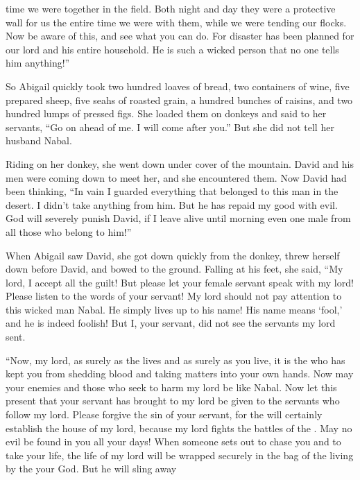 {time
we
were together
in the field.
Both
night
and day
they were a protective wall
for us
the entire
time
we were with
them,
while we were tending
our flocks.
Now
be aware
of this, and see
what
you can do.
For
disaster
has been planned
for our lord
and his entire
household.
He is
such a wicked
person that no one tells him anything!”
\par }{\PP {}So Abigail
quickly
took
two hundred
loaves of bread,
two
containers
of wine,
five
prepared sheep,
five
seahs
of roasted
grain, a hundred
bunches of raisins,
and two hundred
lumps
of pressed
figs.
She loaded
them on
donkeys
and said
to her servants,
“Go
on ahead
of me. I
will come
after
you.” But
she did not
tell
her husband
Nabal.
\par }{\PP {}Riding
on
her donkey,
she went down
under cover
of the mountain.
David
and his men
were coming down
to meet
her, and she encountered them.
Now David
had been thinking, “In vain
I guarded everything
that
belonged to this
man in the desert.
I didn’t take
anything
from
him. But he has repaid
my good
with evil.
God
will severely
punish David,
if
I leave
alive until
morning
even one male
from all
those who belong to him!”
\par }{\PP {}When Abigail
saw
David,
she got down
quickly
from
the donkey,
threw
herself down before
David,
and bowed
to the ground.
Falling
at his feet,
she said,
“My lord,
I
accept all the guilt! But please
let your female servant
speak
with my lord! Please listen
to the words
of your servant!
My lord
should not
pay
attention
to
this
wicked
man
Nabal.
He simply lives up to
his name! His name means
‘fool,’
and he
is indeed foolish! But
I,
your servant,
did not
see
the servants
my lord
sent.
\par }{\PP {}“Now,
my lord,
as surely
as the
{}
lives
and as surely as you live,
it is the
{}
who
has kept
you from shedding
blood
and taking matters
into your own hands.
Now
may your enemies
and those who seek
to
harm
my lord
be like Nabal.
Now
let this
present
that
your servant
has brought
to my lord
be given
to the servants
who follow
my lord.
Please
forgive
the sin
of your servant,
for
the {}
will certainly
establish
the house
of my lord,
because
my lord
fights
the battles
of the {}. May no
evil
be found
in you all your days!
When someone
sets out
to chase
you and to take
your life,
the life
of my lord
will be
wrapped
securely in the bag
of the living
by
the {}
your God.
But he will sling away
}
